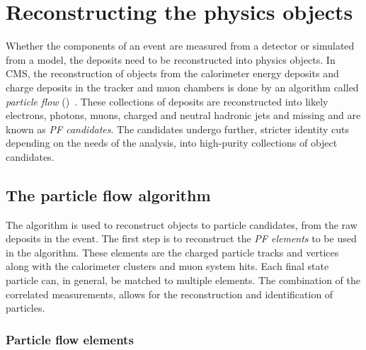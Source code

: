 \chapter{Reconstructing the physics objects}
\label{ch:ObjectReconstruction}

Whether the components of an event are measured from a detector or simulated from a model, the deposits need to be reconstructed into physics objects. 
In CMS, the reconstruction of objects from the calorimeter energy deposits and charge deposits in the tracker and muon chambers is done by an algorithm called \textit{particle flow} (\PF{})~\cite{Event:PFlow}.
These collections of deposits are reconstructed into likely electrons, photons, muons, charged and neutral hadronic jets and missing \pt{} and are known as \textit{PF candidates}.
The \PF{} candidates undergo further, stricter identity cuts depending on the needs of the analysis, into high-purity collections of object candidates.


\section{The particle flow algorithm}
\label{sec:PFlow}

The \PF{} algorithm is used to reconstruct objects to particle candidates, from the raw deposits in the event. 
The first step is to reconstruct the \textit{PF elements} to be used in the algorithm.
These elements are the charged particle tracks and vertices along with the calorimeter clusters and muon system hits.
Each final state particle can, in general, be matched to multiple \PF{} elements.
The combination of the correlated measurements, allows for the reconstruction and identification of particles.

\subsection{Particle flow elements} %
\label{sub:Particle_flow_elements}

